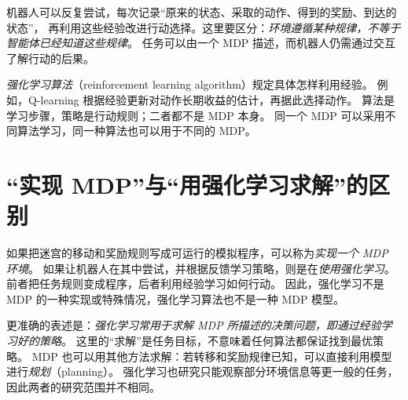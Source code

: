 \documentclass[UTF8,12pt,a4paper,fontset=fandol]{ctexart}
\begin{document}
机器人可以反复尝试，每次记录“原来的状态、采取的动作、得到的奖励、到达的状态”，
再利用这些经验改进行动选择。这里要区分：\emph{环境遵循某种规律，不等于智能体已经知道这些规律}。
任务可以由一个 MDP 描述，而机器人仍需通过交互了解行动的后果。

\emph{强化学习算法}（reinforcement learning algorithm）规定具体怎样利用经验。
例如，Q-learning 根据经验更新对动作长期收益的估计，再据此选择动作。
算法是学习步骤，策略是行动规则；二者都不是 MDP 本身。
同一个 MDP 可以采用不同算法学习，同一种算法也可以用于不同的 MDP。

\section{“实现 MDP”与“用强化学习求解”的区别}
\label{sec:relation-implementation}

如果把迷宫的移动和奖励规则写成可运行的模拟程序，可以称为\emph{实现一个 MDP 环境}。
如果让机器人在其中尝试，并根据反馈学习策略，则是在\emph{使用强化学习}。
前者把任务规则变成程序，后者利用经验学习如何行动。
因此，强化学习不是 MDP 的一种实现或特殊情况，强化学习算法也不是一种 MDP 模型。

更准确的表述是：\emph{强化学习常用于求解 MDP 所描述的决策问题，即通过经验学习好的策略}。
这里的“求解”是任务目标，不意味着任何算法都保证找到最优策略。
MDP 也可以用其他方法求解：若转移和奖励规律已知，可以直接利用模型进行\emph{规划}（planning）。
强化学习也研究只能观察部分环境信息等更一般的任务，因此两者的研究范围并不相同。
\end{document}
